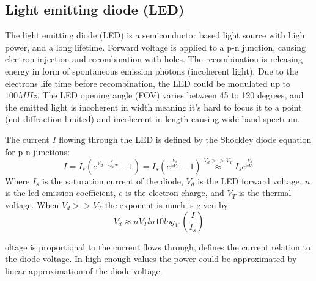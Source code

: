 \documentclass[\main/master.tex]{subfiles}
\begin{document}
\subsection{Light emitting diode (LED)}
The light emitting diode (LED) is a semiconductor based light source with high power, and a long lifetime. Forward voltage is applied to a p-n junction, causing electron injection and recombination with holes. The recombination is releasing energy in form of spontaneous emission photons (incoherent light). Due to the electrons life time before recombination, the LED could be modulated up to $100MHz$. The LED opening angle (FOV) varies between 45 to 120 degrees, and the emitted light is incoherent in width meaning it's hard to focus it to a point (not diffraction limited) and incoherent in length causing wide band spectrum.
\par\noindent
The current  $I$ flowing through the LED is defined by the Shockley diode equation for p-n junctions:
\begin{equation}
I  = I_s (e^{V_d\cdot \frac{e}{n k_B T} }-1) = I_s (e^{\frac{V_d}{n V_T} } -1) \overset{V_d>>V_T}{\approx} I_s e^{\frac{V_d}{n V_T} }   \label{eqn:led current}
\end{equation}
Where $I_s$ is the saturation current of the diode, $V_d$ is the LED forward voltage, $n$ is the led emission coefficient, $e$ is the electron charge, and $V_T$ is the thermal voltage. When $V_d>>V_T$ the exponent is much is given by:
\begin{equation}
V_d \approx n V_T ln10 log_{10} (\frac{I}{I_s}) \label{eqn:led voltage}
\end{equation}


oltage is proportional to the current flows through,
 defines the current relation to the diode voltage. 
In high enough values the power could be approximated by linear approximation of the diode voltage.
\end{document}
